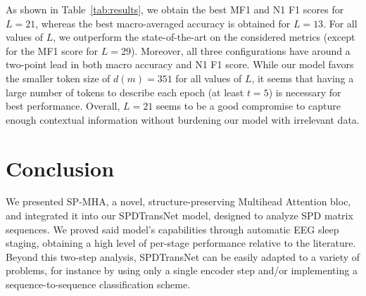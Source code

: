\documentclass{article}
\begin{document}
As shown in Table~\ref{tab:results}, we obtain the best MF1 and N1 F1 scores for $L = 21$, whereas the best macro-averaged accuracy is obtained for $L = 13$.
For all values of $L$, we outperform the state-of-the-art on the considered metrics (except for the MF1 score for $L = 29$). Moreover, all three configurations have around a two-point lead in both macro accuracy and N1 F1 score.
While our model favors the smaller token size of $d(m) = 351$ for all values of $L$, it seems that having a large number of tokens to describe each epoch (at least $t = 5$) is necessary for best performance. 
Overall, $L = 21$ seems to be a good compromise to capture enough contextual information without burdening our model with irrelevant data.

\section{Conclusion}
\label{sec:conclusion}

We presented SP-MHA, a novel, structure-preserving Multihead Attention bloc, and integrated it into our SPDTransNet model, designed to analyze SPD matrix sequences. We proved said model's capabilities through automatic EEG sleep staging, obtaining a high level of per-stage performance relative to the literature.
Beyond this two-step analysis, SPDTransNet can be easily adapted to a variety of problems, for instance by using only a single encoder step and/or implementing a sequence-to-sequence classification scheme.

\newpage


\end{document}
